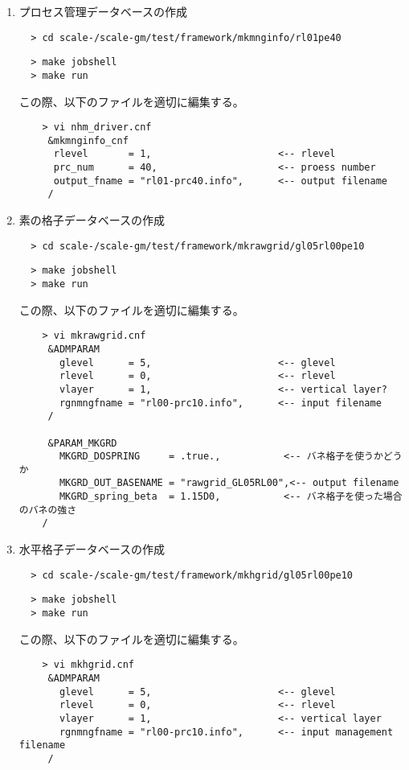 \begin{enumerate}

\item{プロセス管理データベースの作成} 

\verb|  > cd scale-|{\version}\verb|/scale-gm/test/framework/mkmnginfo/rl01pe40|
\vspace{-4mm}
\begin{verbatim}
  > make jobshell
  > make run
\end{verbatim}
 この際、以下のファイルを適切に編集する。
 \begin{verbatim}
    > vi nhm_driver.cnf
     &mkmnginfo_cnf
      rlevel       = 1,                      <-- rlevel 
      prc_num      = 40,                     <-- proess number
      output_fname = "rl01-prc40.info",      <-- output filename
     /
 \end{verbatim}

\item{素の格子データベースの作成}

\verb|  > cd scale-|{\version}\verb|/scale-gm/test/framework/mkrawgrid/gl05rl00pe10|
\vspace{-4mm}
\begin{verbatim}
  > make jobshell
  > make run
\end{verbatim}
 この際、以下のファイルを適切に編集する。
 \begin{verbatim}
    > vi mkrawgrid.cnf
     &ADMPARAM
       glevel      = 5,                      <-- glevel
       rlevel      = 0,                      <-- rlevel
       vlayer      = 1,                      <-- vertical layer?
       rgnmngfname = "rl00-prc10.info",      <-- input filename 
     /

     &PARAM_MKGRD
       MKGRD_DOSPRING     = .true.,           <-- バネ格子を使うかどうか
       MKGRD_OUT_BASENAME = "rawgrid_GL05RL00",<-- output filename
       MKGRD_spring_beta  = 1.15D0,           <-- バネ格子を使った場合のバネの強さ
    /
 \end{verbatim}


\item{水平格子データベースの作成}

\verb|  > cd scale-|{\version}\verb|/scale-gm/test/framework/mkhgrid/gl05rl00pe10|
\vspace{-4mm}
\begin{verbatim}
  > make jobshell
  > make run
\end{verbatim}
 この際、以下のファイルを適切に編集する。
 \begin{verbatim}
    > vi mkhgrid.cnf
     &ADMPARAM
       glevel      = 5,                      <-- glevel
       rlevel      = 0,                      <-- rlevel
       vlayer      = 1,                      <-- vertical layer
       rgnmngfname = "rl00-prc10.info",      <-- input management filename
     /


\end{verbatim}
\end{enumerate}
